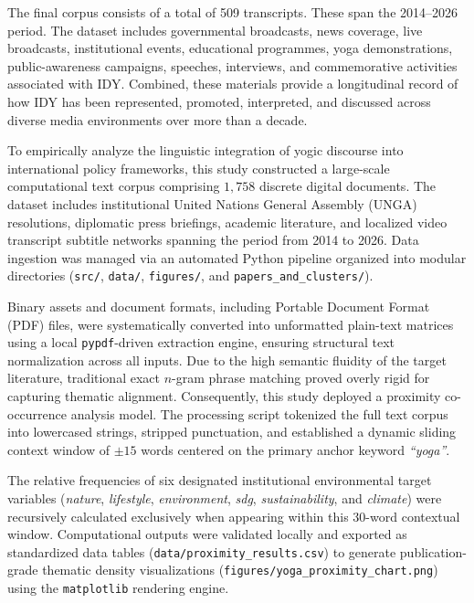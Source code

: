 \documentclass[11pt]{article}
\begin{document}
The final corpus consists of a total of 509 transcripts. These span the 2014--2026 period. The dataset includes governmental broadcasts, news coverage, live broadcasts, institutional events, educational programmes, yoga demonstrations, public-awareness campaigns, speeches, interviews, and commemorative activities associated with IDY. Combined, these materials provide a longitudinal record of how IDY has been represented, promoted, interpreted, and discussed across diverse media environments over more than a decade.

\label{yoga lifestyle and SDGs methodology}

To empirically analyze the linguistic integration of yogic discourse into international policy frameworks, this study constructed a large-scale computational text corpus comprising $1,758$ discrete digital documents. The dataset includes institutional United Nations General Assembly (UNGA) resolutions, diplomatic press briefings, academic literature, and localized video transcript subtitle networks spanning the period from 2014 to 2026. Data ingestion was managed via an automated Python pipeline organized into modular directories (\texttt{src/}, \texttt{data/}, \texttt{figures/}, and \texttt{papers\_and\_clusters/}). 

Binary assets and document formats, including Portable Document Format (PDF) files, were systematically converted into unformatted plain-text matrices using a local \texttt{pypdf}-driven extraction engine, ensuring structural text normalization across all inputs. Due to the high semantic fluidity of the target literature, traditional exact $n$-gram phrase matching proved overly rigid for capturing thematic alignment. Consequently, this study deployed a proximity co-occurrence analysis model. The processing script tokenized the full text corpus into lowercased strings, stripped punctuation, and established a dynamic sliding context window of $\pm15$ words centered on the primary anchor keyword \textit{``yoga''}. 

The relative frequencies of six designated institutional environmental target variables (\textit{nature}, \textit{lifestyle}, \textit{environment}, \textit{sdg}, \textit{sustainability}, and \textit{climate}) were recursively calculated exclusively when appearing within this 30-word contextual window. Computational outputs were validated locally and exported as standardized data tables (\texttt{data/proximity\_results.csv}) to generate publication-grade thematic density visualizations (\texttt{figures/yoga\_proximity\_chart.png}) using the \texttt{matplotlib} rendering engine.
\end{document}
